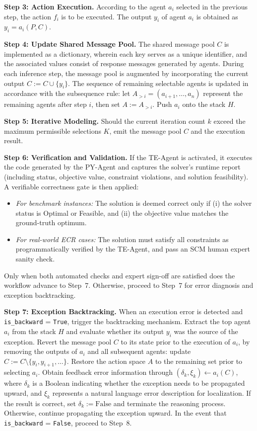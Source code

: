 \documentclass[preprint,12pt]{elsarticle}
\begin{document}
\medskip
\noindent\textbf{Step 3: Action Execution.}
According to the agent $a_i$ selected in the previous step, the action $f_i$ is to be executed. The output $y_i$ of agent $a_i$ is obtained as $y_i=a_i\left(P,C\right)$.

\medskip
\noindent\textbf{Step 4: Update Shared Message Pool.}
The shared message pool $C$ is implemented as a dictionary, wherein each key serves as a unique identifier, and the associated values consist of response messages generated by agents. During each inference step, the message pool is augmented by incorporating the current output $C:= C\cup\{y_i\}$. The sequence of remaining selectable agents is updated in accordance with the subsequence rule: let $A_{>i}=\left(a_{i+1},\ldots,a_n\right)$ represent the remaining agents after step $i$, then set $A:= A_{>i}$. Push $a_i$ onto the stack $H$.

\medskip
\noindent\textbf{Step 5: Iterative Modeling.}
Should the current iteration count $k$ exceed the maximum permissible selections $K$, emit the message pool $C$ and the execution result.

\medskip
\noindent\textbf{Step 6: Verification and Validation.}
If the TE-Agent is activated, it executes the code generated by the PY-Agent and captures the solver's runtime report (including status, objective value, constraint violations, and solution feasibility). A verifiable correctness gate is then applied:
\begin{itemize}
    \item \textit{For benchmark instances:} The solution is deemed correct only if (i) the solver status is Optimal or Feasible, and (ii) the objective value matches the ground-truth optimum.
    \item \textit{For real-world ECR cases:} The solution must satisfy all constraints as programmatically verified by the TE-Agent, and pass an SCM human expert sanity check.
\end{itemize}
Only when both automated checks and expert sign-off are satisfied does the workflow advance to Step~7. Otherwise, proceed to Step~7 for error diagnosis and exception backtracking.

\medskip
\noindent\textbf{Step 7: Exception Backtracking.}
When an execution error is detected and \texttt{is\_backward} = \texttt{True}, trigger the backtracking mechanism. Extract the top agent $a_i$ from the stack $H$ and evaluate whether its output $y_i$ was the source of the exception. Revert the message pool $C$ to its state prior to the execution of $a_i$, by removing the outputs of $a_i$ and all subsequent agents: update $C:= C\setminus\{y_i,y_{i+1},\ldots\}$. Restore the action space $A$ to the remaining set prior to selecting $a_i$. Obtain feedback error information through $\left(\delta_k,\xi_k\right)\gets a_i\left(C\right)$, where $\delta_k$ is a Boolean indicating whether the exception needs to be propagated upward, and $\xi_k$ represents a natural language error description for localization. If the result is correct, set $\delta_k:= \mathrm{False}$ and terminate the reasoning process. Otherwise, continue propagating the exception upward. In the event that \texttt{is\_backward} = \texttt{False}, proceed to Step~8.
\end{document}
